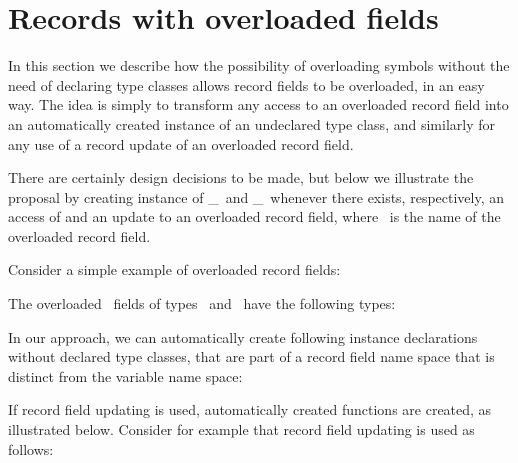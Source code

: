 \section{Records with overloaded fields}
\label{sec:overloaded-record-fields}

In this section we describe how the possibility of overloading symbols
without the need of declaring type classes allows record fields to be
overloaded, in an easy way. The idea is simply to transform any access
to an overloaded record field into an automatically created instance
of an undeclared type class, and similarly for any use of a record
update of an overloaded record field. 

There are certainly design decisions to be made, but below we
illustrate the proposal by creating instance of \get\_\fieldname\ and
\update\_\fieldname\ whenever there exists, respectively, an access of
and an update to an overloaded record field, where \fieldname\ is the
name of the overloaded record field.

Consider a simple example of overloaded record fields: 

\progb{\data\ \Address\ \= = \Address\ \= \{ \id\ :: \Int, \address\ \= :: \String\ \= \kill
\data\ \Person\  \> = \Person\  \> \{ \id\ :: \Int, \name\    \> :: \String\ \>\}\\
\data\ \Address\ \> = \Address\ \> \{ \id\ :: \Int, \address\ \> :: \String\ \>\}
}

The overloaded \id\ fields of types \Person\ and \Address\ have the
following types:

\progb{\id\ :: \Address\ \= \kill
\id\ :: \Person\  \>$\rightarrow$ \Int\\
\id\ :: \Address\ \>$\rightarrow$ \Int
}

In our approach, we can automatically create following instance
declarations without declared type classes, that are part of a record
field name space that is distinct from the variable name space:

\progb{
\get\_\id\ :: \Person\ $\rightarrow$ \Int\\
\instance\ \get\_\id\ (\Person\ \id\ \_\ )  = \id\\ \\

\get\_\id\ :: \Address\ $\rightarrow$ \Int\\
\instance\ \get\_\id\ (\Address\ \id\ \_\ ) = \id}

If record field updating is used, automatically created functions are
created, as illustrated below. Consider for example that record field
updating is used as follows:

